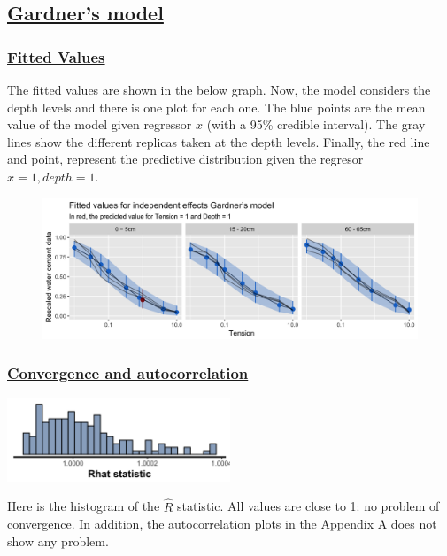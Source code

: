 \documentclass{article}
\begin{document}
\subsection*{\underline{Gardner's model}}
\subsubsection*{\underline{Fitted Values}}

The fitted values are shown in the below graph. Now, the model considers the depth levels and there is one plot for each one. The blue points are the mean value of the model given regressor $x$ (with a 95\% credible interval). The gray lines show the different replicas taken at the depth levels. Finally, the red line and point, represent the predictive distribution given the regresor $x = 1, depth = 1$.

\begin{figure}[ht!]
\centering
\includegraphics[width=14cm]{indep_2pars_pred.png}
\end{figure}

\subsubsection*{\underline{Convergence and autocorrelation}}
\begin{minipage}{0.50\textwidth}
\includegraphics[width=\linewidth, height = 2.5cm]{indep_2pars_rhat.png}
\end{minipage}
\begin{minipage}{0.50\textwidth}
Here is the histogram of the $\widehat{R}$ statistic. All values are close to 1: no problem of convergence. In addition, the autocorrelation plots in the Appendix A does not show any problem.
\end{minipage}
\end{document}

